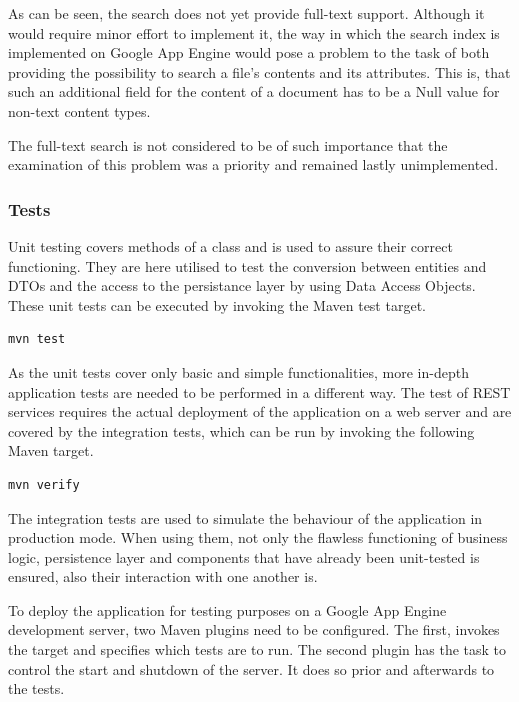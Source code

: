 \label{reason-no-full-text-support}
As can be seen, the search does not yet provide full-text support. Although it would require minor effort to implement it, the way in which the search index is implemented on Google App Engine would pose a problem to the task of both providing the possibility to search a file's contents and its attributes. This is, that such an additional field for the content of a document has to be a Null value for non-text content types.

The full-text search is not considered to be of such importance that the examination of this problem was a priority and remained lastly unimplemented.

\subsubsection{Tests}
\label{subsubsec:collaboratex-tests}

Unit testing covers methods of a class and is used to assure their correct functioning. They are here utilised to test the conversion between entities and DTOs and the  access to the persistance layer by using Data Access Objects. These unit tests can be executed by invoking the Maven test target.

\begin{lstlisting}[caption=Invoke Unit Tests in CollaboraTeX]
mvn test
\end{lstlisting}

As the unit tests cover only basic and simple functionalities, more in-depth application tests are needed to be performed in a different way. The test of REST services requires the actual deployment of the application on a web server and are covered by the integration tests, which can be run by invoking the following Maven target.

\begin{lstlisting}[caption=Running Integration Tests in CollaboraTeX]
mvn verify
\end{lstlisting}

The integration tests are used to simulate the behaviour of the application in production mode. When using them, not only the flawless functioning of business logic, persistence layer and components that have already been unit-tested is ensured, also their interaction with one another is. 

To deploy the application for testing purposes on a Google App Engine development server, two Maven plugins need to be configured. The first,  invokes the target  and specifies which tests are to run. The second plugin has the task to control the start and shutdown of the server. It does so prior and afterwards to the tests.

